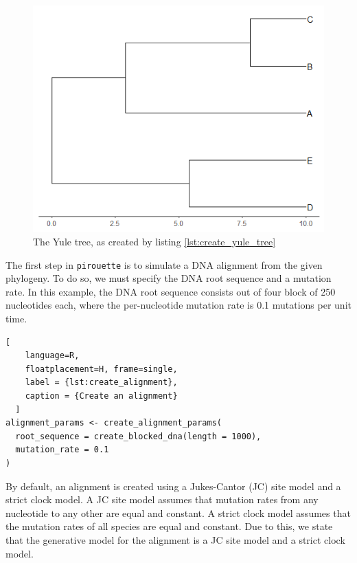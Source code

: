 \documentclass{article}
\begin{document}
\begin{figure}[h]
  \includegraphics[width=\textwidth]{figure_bd.png}
  \caption{The Yule tree, as created by listing \ref{lst:create_yule_tree}}
\end{figure}

The first step in \verb;pirouette; is to simulate a DNA alignment from the given phylogeny. 
To do so, we must specify the DNA root sequence and a mutation rate. 
In this example, the DNA root sequence consists out of four block of 250 nucleotides each, 
where the per-nucleotide mutation rate is 0.1 mutations per unit time.

\begin{lstlisting}[
    language=R,
    floatplacement=H, frame=single,
    label = {lst:create_alignment}, 
    caption = {Create an alignment}
  ]
alignment_params <- create_alignment_params(
  root_sequence = create_blocked_dna(length = 1000),
  mutation_rate = 0.1
)
\end{lstlisting}

By default, an alignment is created using a Jukes-Cantor (JC) site model
and a strict clock model. A JC site model assumes that mutation rates from any nucleotide to any other are equal and constant. A strict clock model assumes that the mutation rates of all species are equal and constant.
Due to this, we state that the generative model for the alignment is
a JC site model and a strict clock model.

\end{document}
